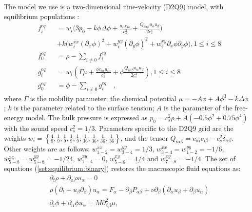\documentclass[preprint,12pt]{elsarticle}
\begin{document}
The model we use is a two-dimensional nine-velocity (D2Q9) model,
with equilibrium populations \cite{pooley-contact}:
\begin{equation}
\label{set:equilibrium:binary}
\begin{aligned}
&f_i^{eq}&&=w_i 
\biggl(3
p_0 - k \phi \Delta \phi
+\frac{u_{\alpha}c_{i\alpha}}{c_s^2}+\frac{Q_{i\alpha\beta}u_{\alpha } u_ {
\beta}}{2 c_s^4}\biggr)\\
&&&+k\bigl(w_i^{xx} (\partial_x \phi)^2+w_i^{yy} (\partial_y \phi)^2 +w_i^{xy} \partial_x
\phi \partial_y \phi \bigr), 1\leq i \leq 8\\
&f_0^{eq}&&=\rho-\sum_{i\neq0}{f_i^{eq}}\\
&g_i^{eq}&&=w_i\left(\Gamma \mu + \frac{\phi c_{i\alpha} u_{i\alpha}}{c_s^2}+\phi
\frac{Q_{i\alpha\beta}u_{\alpha}u_{\beta}}{2 c_s^4}\right), 1\leq i \leq 8 \\
&g_0^{eq}&&=\phi-\sum_{i\neq0}{g_i^{eq}}\quad,
\end{aligned}
\end{equation}
where $\Gamma$ is the mobility parameter; the chemical potential
$\mu=-A\phi+A\phi^3-k\Delta\phi$; $k$ is the parameter related to the surface
tension; $A$ is the parameter of the free-energy model. The bulk pressure
is expressed as $p_0=c_s^2 \rho +A (-0.5 \phi^2+0.75 \phi^4)$ {\color{red} with
the sound speed $c_s^2=1/3$}. 
Parameters specific to the D2Q9 grid are the weights
$w_i=\left\{\frac{4}{9},\frac{1}{9},\frac{1}{9},\frac{1}{9},\frac{1}{9},
\frac{1}{36},\frac{1}{36},\frac{1}{36},\frac{1}{36}\right\}$, and the tensor
$Q_{i\alpha\beta}=c_{i\alpha} c_{i\beta} - c_s^2 \delta_{\alpha\beta}$.  
{\color{red}
Other weights 
are as follows:}
$w^{xx}_{1-2}=w^{yy}_{3-4}=1/3$, $w^{xx}_{3-4}=w^{yy}_{1-2}=-1/6$,
$w^{xx}_{5-8}=w^{yy}_{5-8}=-1/24$, $w^{xy}_{1-4}=0$, $w^{xy}_{5-6}=1/4$ and
$w^{xy}_{7-8}=-1/4$. The set of equations (\ref{set:equilibrium:binary}) restores the
macroscopic
fluid equations as:
\begin{equation}
\begin{aligned}
&\partial_t \rho+ \partial_{\alpha} \rho u_{\alpha}=0\\
&\rho\left(\partial_t+u_{\beta}\partial_{\beta}\right) u_{\alpha}= F_{\alpha}
-\partial_{\beta}P_{\alpha \beta} +
\nu\partial_{\beta}\left(\partial_{\alpha}u_{\beta}+\partial_{\beta} u_{\alpha}\right)\\
&\partial_t \phi + \partial_{\alpha} \phi u_{\alpha}=M \partial^2_{\beta\beta} \mu,
\end{aligned}
\label{binary:fluid:system}
\end{equation}
\end{document}
